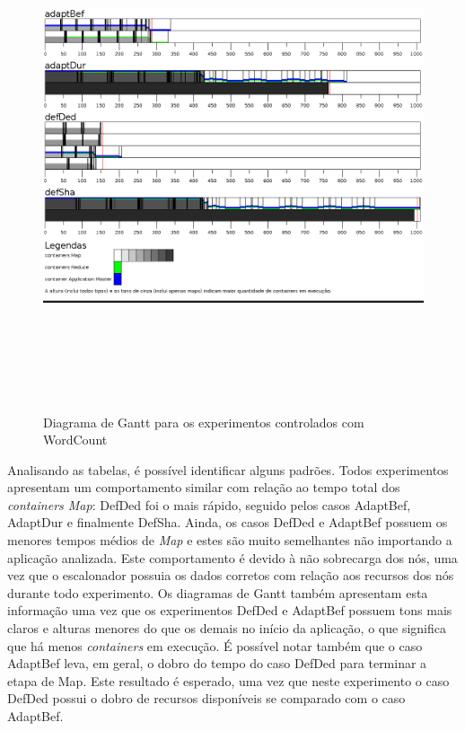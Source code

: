 \begin{figure}[!ht]
	\centering
	\includegraphics[height=15cm]{figuras/WC-simul.png}
	\caption{Diagrama de Gantt para os experimentos controlados com WordCount}
	\label{fig:exp1WC}
\end{figure}

Analisando as tabelas, é possível identificar alguns padrões. Todos experimentos apresentam um comportamento similar com relação ao tempo total dos \textit{containers Map}: DefDed foi o mais rápido, seguido pelos casos AdaptBef, AdaptDur e finalmente DefSha. Ainda, os casos DefDed e AdaptBef possuem os menores tempos médios de \textit{Map} e estes são muito semelhantes não importando a aplicação analizada. Este comportamento é devido à não sobrecarga dos nós, uma vez que o escalonador possuia os dados corretos com relação aos recursos dos nós durante todo experimento.
Os diagramas de Gantt também apresentam esta informação uma vez que os experimentos DefDed e AdaptBef possuem tons mais claros e alturas menores do que os demais no início da aplicação, o que significa que há menos \textit{containers} em execução. É possível notar também que o caso AdaptBef leva, em geral, o dobro do tempo do caso DefDed para terminar a etapa de Map. Este resultado é esperado, uma vez que neste experimento o caso DefDed possui o dobro de recursos disponíveis se comparado com o caso AdaptBef. 


